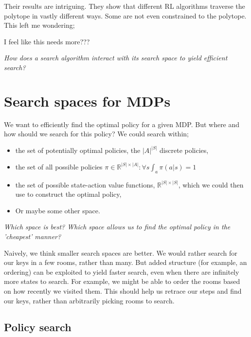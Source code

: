 Their results are intriguing. They show that different RL algorithms traverse the polytope in vastly different ways.
Some are not even constrained to the polytope. This left me wondering;

{\color{red}I feel like this needs more???}

\begin{displayquote}
  \textit{How does a search algorithm interact with its search space to yield efficient search?}
\end{displayquote}

\section{Search spaces for MDPs}\label{search-spaces-mdps}

We want to efficiently find the optimal policy for a given MDP. But where and how should we
search for this policy? We could search within;

\begin{itemize}
\tightlist
  \item the set of potentially optimal policies, the $|A|^{|S|}$ discrete policies,
  \item the set of all possible policies $\pi \in \mathbb R^{|S| \times |A|}: \forall s \int_a \pi(a|s) = 1$
  \item the set of possible state-action value functions, $\mathbb R^{|S|\times|S|}$,
  which we could then use to construct the optimal policy,
  \item Or maybe some other space.
\end{itemize}

\begin{displayquote}
  \textit{Which space is best? Which space allows us to find the optimal policy in the 'cheapest' manner?}
\end{displayquote}

Naively, we think smaller search spaces are better. We would rather
search for our keys in a few rooms, rather than many. But added
structure (for example, an ordering) can be exploited to yield faster
search, even when there are infinitely more states to search. For example,
we might be able to order the rooms based on how recently we visited them.
This should help us retrace our steps and find our keys, rather than arbitrarily
picking rooms to search.

\subsection{Policy search}

